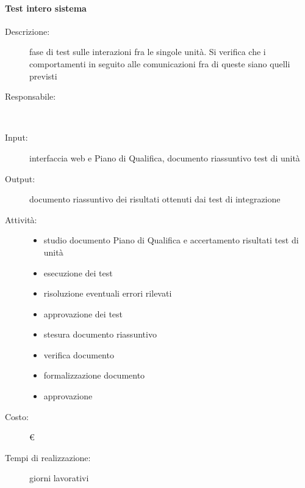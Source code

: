 \paragraph{Test intero sistema}
\begin{description}
\item[Descrizione:] fase di test sulle interazioni fra le singole unità. Si verifica che i comportamenti in seguito alle comunicazioni fra di queste siano quelli previsti \\

\item[Responsabile:] \\

\item[Input:] interfaccia web e Piano di Qualifica, documento riassuntivo test di unità \\

\item[Output:] documento riassuntivo dei risultati ottenuti dai test di integrazione \\

\item[Attività:]
\begin{itemize}
\item studio documento Piano di Qualifica e accertamento risultati test di unità
\item esecuzione dei test
\item risoluzione eventuali errori rilevati
\item approvazione dei test
\item stesura documento riassuntivo
\item verifica documento
\item formalizzazione documento
\item approvazione
\end{itemize}
\item[Costo:] \euro \\
\item[Tempi di realizzazione:]  giorni lavorativi
\end{description}






